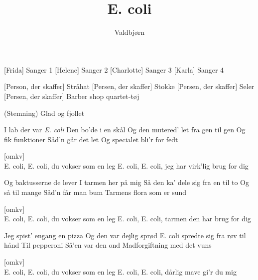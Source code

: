 \documentclass[a4paper,11pt]{article}
\title{E. coli}
\author{Valdbjørn}
\begin{document}
\maketitle

\begin{roles}
    [Frida] Sanger  1
    [Helene] Sanger 2
    [Charlotte] Sanger 3
    [Karla] Sanger 4
\end{roles}

\begin{props}
    [Person, der skaffer] Stråhat
    [Persen, der skaffer] Stokke
    [Persen, der skaffer] Seler
    [Persen, der skaffer] Barber shop quartet-tøj
\end{props}

\scene (Stemning) Glad og fjollet 

\begin{song}
   I lab der var \textit{E. coli}
Den bo'de i en skål
Og den mutered' let fra gen til gen
Og fik funktioner
Såd'n går det let
Og specialet bli'r for fedt

  [omkv]\\ E. coli, E. coli, du vokser som en leg
E. coli, E. coli, jeg har virk'lig brug for dig

    Og baktusserne de lever
I tarmen her på mig
Så den ka' dele sig fra en til to
Og så til mange
Såd'n får man bum
Tarmens flora som er sund

  [omkv]\\ E. coli, E. coli, du vokser som en leg
E. coli, E. coli, tarmen den har brug for dig

    Jeg spist' engang en pizza
Og den var dejlig sprød
E. coli spredte sig fra røv til hånd
Til pepperoni
Så'en var den ond
Madforgiftning med det vuns

  [omkv]\\ E. coli, E. coli, du vokser som en leg
E. coli, E. coli, dårlig mave gi'r du mig


\end{song}
\end{document}
